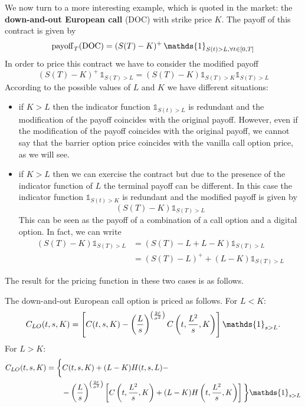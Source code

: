 We now turn to a more interesting example, which is quoted in the market: the \textbf{down-and-out European call} (DOC) with strike price $K$. The payoff of this contract is given by
\begin{equation}
  \pay_T(\text{DOC}) = (S(T)-K)^+\,\mathds{1}_{S(t)>L,\forall t\in[0,T]}
\end{equation}
In order to price this contract we have to consider the modified payoff
\begin{equation}
  (S(T)-K)^+\,\mathds{1}_{S(T)>L} = (S(T)-K)\mathds{1}_{S(T)>K}\mathds{1}_{S(T)>L}
\end{equation}
According to the possible values of $L$ and $K$ we have different situations:
\begin{itemize}
  \item if $K>L$ then the indicator function $\mathds{1}_{S(t)>L}$ is redundant and the modification of the payoff coincides with the original payoff. However, even if the modification of the payoff coincides with the original payoff, we cannot say that the barrier option price coincides with the vanilla call option price, as we will see.
  \item if $K>L$ then we can exercise the contract but due to the presence of the indicator function of $L$ the terminal payoff can be different. In this case the indicator function $\mathds{1}_{S(t)>K}$ is redundant and the modified payoff is given by
  \begin{equation*}
    (S(T)-K)\mathds{1}_{S(T)>L}
  \end{equation*}
  This can be seen as the payoff of a combination of a call option and a digital option. In fact, we can write
  \begin{align*}
    (S(T)-K)\mathds{1}_{S(T)>L} &= (S(T)-L+L-K)\mathds{1}_{S(T)>L} \\
    &=
    (S(T)-L)^+ + (L-K)\mathds{1}_{S(T)>L}
  \end{align*}
\end{itemize}
The result for the pricing function in these two cases is as follows.
\begin{proposition}
  The down-and-out European call option is priced as follows. For $L<K$:
  \begin{equation}\label{clo}
    C_{LO}(t,s,K) = \left[C(t,s,K)-\left(\frac{L}{s}\right)^{\left(\frac{2\Tilde{r}}{\sigma^2}\right)} C\left(t,\frac{L^2}{s},K\right)\right]\mathds{1}_{s>L}.
  \end{equation}
  For $L>K$:
  \begin{align}
      \notag C_{LO}(t,s,K) &= \bigg\{C(t,s,K) + (L-K)H(t,s,L) - \\
      &\qquad
      - \left(\frac{L}{s}\right)^{\left(\frac{2\Tilde{r}}{\sigma^2}\right)}
      \left[C\left(t,\frac{L^2}{s},K\right) + (L-K)H\left(t,\frac{L^2}{s},K\right)\right]\bigg\}\mathds{1}_{s>L}
  \end{align}
\end{proposition}
